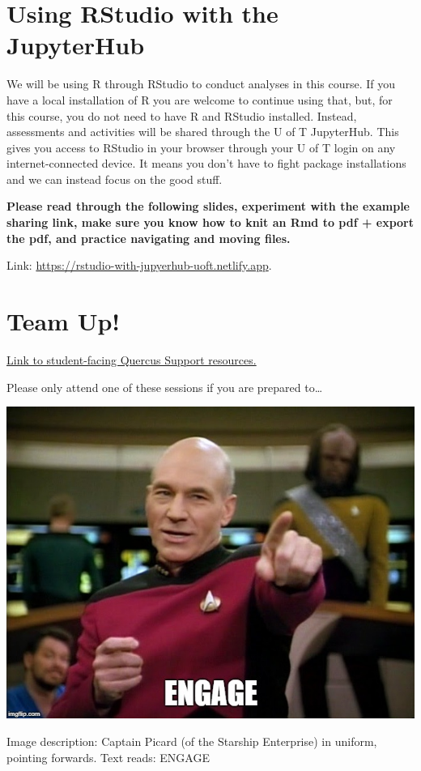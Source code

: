 \documentclass[
  openany]{book}
\begin{document}
\hypertarget{using-rstudio-with-the-jupyterhub}{%
\section{Using RStudio with the JupyterHub}\label{using-rstudio-with-the-jupyterhub}}

We will be using R through RStudio to conduct analyses in this course. If you have a local installation of R you are welcome to continue using that, but, for this course, you do not need to have R and RStudio installed. Instead, assessments and activities will be shared through the U of T JupyterHub. This gives you access to RStudio in your browser through your U of T login on any internet-connected device. It means you don't have to fight package installations and we can instead focus on the good stuff.

\textbf{Please read through the following slides, experiment with the example sharing link, make sure you know how to knit an Rmd to pdf + export the pdf, and practice navigating and moving files.}

Link: \url{https://rstudio-with-jupyerhub-uoft.netlify.app}.

\hypertarget{team-up}{%
\section{Team Up!}\label{team-up}}

\href{https://q.utoronto.ca/courses/46670/pages/integration-team-up-for-students}{Link to student-facing Quercus Support resources.}

Please only attend one of these sessions if you are prepared to\ldots{}

\begin{center}\includegraphics[width=0.6\linewidth]{images/course-tools/engage} \end{center}

Image description: Captain Picard (of the Starship Enterprise) in uniform, pointing forwards. Text reads: ENGAGE
\end{document}
